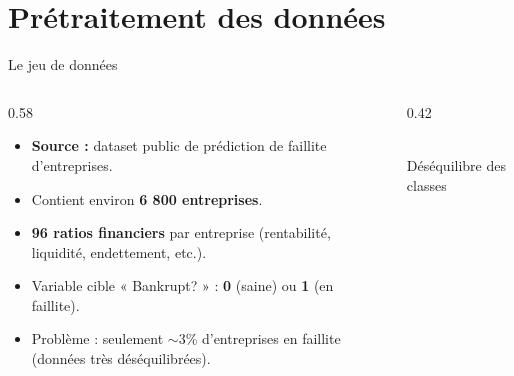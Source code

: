 \documentclass[10pt,aspectratio=169]{beamer}
\begin{document}
\section{Prétraitement des données}

\begin{frame}{Le jeu de données}
  \begin{columns}[T]
    \begin{column}{0.58\textwidth}
      \begin{itemize}
        \item \textbf{Source :} dataset public de prédiction de faillite
              d'entreprises.
        \item Contient environ \textbf{6 800 entreprises}.
        \item \textbf{96 ratios financiers} par entreprise (rentabilité,
              liquidité, endettement, etc.).
        \item Variable cible « Bankrupt? » :
              \textbf{0} (saine) ou \textbf{1} (en faillite).
        \item \alert{Problème : seulement $\sim$3\% d'entreprises en
              faillite} (données très déséquilibrées).
      \end{itemize}
    \end{column}
    \begin{column}{0.42\textwidth}
      \centering
      \\[2pt]
      {\scriptsize Déséquilibre des classes}
    \end{column}
  \end{columns}
\end{frame}
\end{document}
